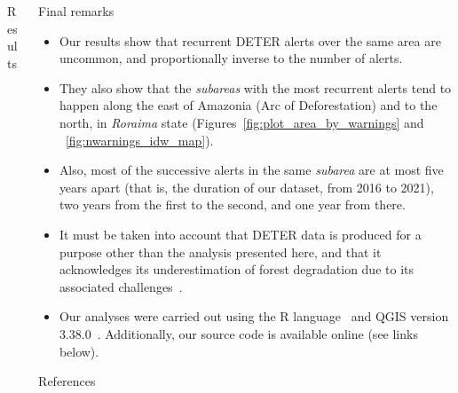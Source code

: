 \documentclass[20pt]{beamer}
\begin{document}
\begin{frame}[fragile,t]
\begin{columns}[t]
\begin{column}{0.33\linewidth}
\begin{block}{Results\vphantom{g}}
    \end{block}
\end{column}




\begin{column}{0.33\linewidth}

\vspace{0.5cm}

    \begin{block}{Final remarks\vphantom{g}}
        \begin{itemize}
            \item Our results show that recurrent DETER alerts over the same area are uncommon, and proportionally inverse to the number of alerts.
            \item They also show that the \textit{subareas} with the most recurrent alerts tend to happen along the east of Amazonia (Arc of Deforestation) and to the north, in \textit{Roraima} state (Figures~\ref{fig:plot_area_by_warnings} and ~\ref{fig:nwarnings_idw_map}).
            \item Also, most of the successive alerts in the same \textit{subarea} are at most five years apart (that is, the duration of our dataset, from 2016 to 2021), two years from the first to the second, and one year from there. 
            \item It must be taken into account that DETER data is produced for a purpose other than the analysis presented here, and that it acknowledges its underestimation of forest degradation due to its associated challenges~\cite{dealmeida2022}.
            \item Our analyses were carried out using the R language~\cite{ihaka1996} and QGIS version 3.38.0~\cite{QGIS_software}. Additionally, our source code is available online (see links below).
        \end{itemize}
    \end{block}

\vspace{1cm}

    \begin{block}{References\vphantom{g}}
        {\small


        }
    \end{block}

\vspace{0.5cm}


\end{column}
\end{columns}
\end{frame}
\end{document}
